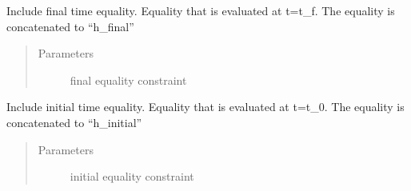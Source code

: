 \documentclass[letterpaper,10pt,english]{sphinxmanual}
\begin{document}
\begin{fulllineitems}
\begin{fulllineitems}
\label{\detokenize{yaocptool.modelling:yaocptool.modelling.ocp.OptimalControlProblem.include_final_time_equality}}
Include final time equality. Equality that is evaluated at t=t\_f.
The equality is concatenated to “h\_final”
\begin{quote}\begin{description}
\item[{Parameters}] \leavevmode
{} \textendash{} final equality constraint

\end{description}\end{quote}

\end{fulllineitems}


\begin{fulllineitems}
\label{\detokenize{yaocptool.modelling:yaocptool.modelling.ocp.OptimalControlProblem.include_initial_time_equality}}
Include initial time equality. Equality that is evaluated at t=t\_0.
The equality is concatenated to “h\_initial”
\begin{quote}\begin{description}
\item[{Parameters}] \leavevmode
{} \textendash{} initial equality constraint

\end{description}\end{quote}

\end{fulllineitems}


\begin{fulllineitems}
\label{\detokenize{yaocptool.modelling:yaocptool.modelling.ocp.OptimalControlProblem.include_optimization_parameter}}
\end{fulllineitems}


\end{fulllineitems}
\end{document}
